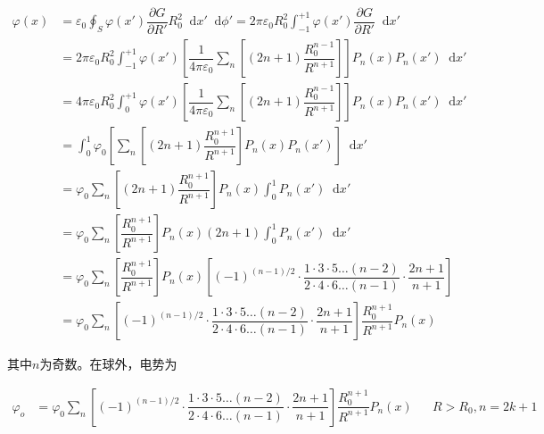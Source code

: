 \documentclass{article}
\newcommand*{\md}{\mathop{}\!\mathrm{d}}
\begin{document}
\begin{equation*}
  \begin{aligned}
    \varphi \left( x \right) &= \varepsilon_0 \oint_S \varphi \left( x' \right) \dfrac{\partial G}{\partial R'} R_0^2 \md x' \md \phi'
    = 2 \pi \varepsilon_0 R_0^2 \int_{-1}^{+1} \varphi \left( x' \right) \dfrac{\partial G}{\partial R'} \md x' \\
    &= 2 \pi \varepsilon_0 R_0^2 \int_{-1}^{+1} \varphi \left( x' \right) \left[ \dfrac{1}{4\pi \varepsilon_0} \sum_n \left[ \left( 2n+1 \right) \dfrac{R_0^{n-1} }{R^{n+1}} \right] \right] P_n \left( x \right) P_n \left( x' \right) \md x' \\
    &= 4 \pi \varepsilon_0 R_0^2 \int_0^{+1} \varphi \left( x' \right) \left[\dfrac{1}{4\pi \varepsilon_0} \sum_n \left[ \left( 2n+1 \right) \dfrac{R_0^{n-1} }{R^{n+1}} \right]  \right] P_n \left( x \right) P_n \left( x' \right) \md x' \\
    &= \int_0^1 \varphi_0  \left[ \sum_n \left[ \left( 2n+1 \right) \dfrac{R_0^{n+1} }{R^{n+1}} \right] P_n \left( x \right) P_n \left( x' \right) \right] \md x' \\
    &= \varphi_0 \sum_n  \left[ \left( 2n+1 \right) \dfrac{R_0^{n+1} }{R^{n+1}} \right] P_n \left( x \right) \int_0^1  P_n \left( x' \right) \md x' \\
    &= \varphi_0 \sum_n  \left[  \dfrac{R_0^{n+1} }{R^{n+1}} \right] P_n \left( x \right) \left( 2n+1 \right) \int_0^1  P_n \left( x' \right) \md x' \\
    &= \varphi_0 \sum_n  \left[ \dfrac{R_0^{n+1} }{R^{n+1}} \right] P_n \left( x \right) \left[ \left( -1  \right)^{\left( n-1 \right)/ 2} \cdot \dfrac{1 \cdot 3 \cdot 5 \dots \left( n-2 \right)}{2 \cdot 4 \cdot 6 \dots \left( n-1 \right)} \cdot \dfrac{2n+1}{n+1} \right] \\
    &= \varphi_0 \sum_n  \left[ \left( -1  \right)^{\left( n-1 \right)/ 2} \cdot \dfrac{1 \cdot 3 \cdot 5 \dots \left( n-2 \right)}{2 \cdot 4 \cdot 6 \dots \left( n-1 \right)} \cdot \dfrac{2n+1}{n+1} \right] \dfrac{R_0^{n+1} }{R^{n+1}} P_n \left( x \right) 
  \end{aligned}
\end{equation*}

其中$n$为奇数。在球外，电势为

\begin{equation*}
  \begin{aligned}
    \varphi_o &=
    \varphi_0 \sum_n \left[ \left( -1  \right)^{\left( n-1 \right)/ 2} \cdot \dfrac{1 \cdot 3 \cdot 5 \dots \left( n-2 \right)}{2 \cdot 4 \cdot 6 \dots \left( n-1 \right)} \cdot \dfrac{2n+1}{n+1} \right] \dfrac{R_0^{n+1} }{R^{n+1}} P_n \left( x \right) && R>R_0,n=2k+1
  \end{aligned}
\end{equation*}
\end{document}

